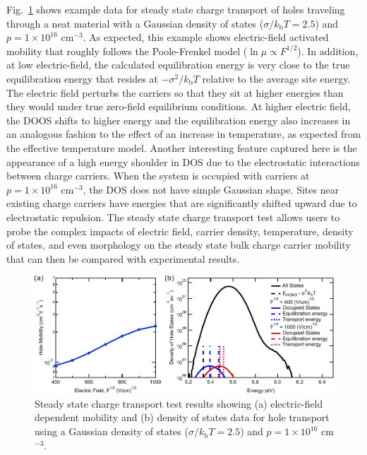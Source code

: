 \documentclass[%
 reprint,onecolumn,notitlepage,
superscriptaddress,longbibliography,
 amsmath,amssymb,
 aps,rmp,floatfix,
]{revtex4-1}
\begin{document}
Fig.\ \ref{fig:steady_transport_example} shows example data for steady state charge transport of holes traveling through a neat material with a Gaussian density of states ($\sigma / k_\text{b}T = 2.5$) and $p = 1 \times 10^{16}$ cm$^{-3}$.
As expected, this example shows electric-field activated mobility that roughly follows the Poole-Frenkel model ($\ln\mu\propto F^{1/2}$).
In addition, at low electric-field, the calculated equilibration energy is very close to the true equilibration energy that resides at $-\sigma^2 / k_\text{b}T$ relative to the average site energy. 
The electric field perturbs the carriers so that they sit at higher energies than they would under true zero-field equilibrium conditions.
At higher electric field, the DOOS shifts to higher energy and the equilibration energy also increases in an analogous fashion to the effect of an increase in temperature, as expected from the effective temperature model.\cite{baranovskii2014pssb}
Another interesting feature captured here is the appearance of a high energy shoulder in DOS due to the electrostatic interactions between charge carriers.
When the system is occupied with carriers at $p = 1 \times 10^{16}$ cm$^{-3}$, the DOS does not have simple Gaussian shape.
Sites near existing charge carriers have energies that are significantly shifted upward due to electrostatic repulsion.
The steady state charge transport test allows users to probe the complex impacts of electric field, carrier density, temperature, density of states, and even morphology on the steady state bulk charge carrier mobility that can then be compared with experimental results. 

\begin{figure}[h]
    \centering
    \includegraphics{Steady_transport_example_data.pdf}
    \caption{Steady state charge transport test results showing (a) electric-field dependent mobility and (b) density of states data for hole transport using a Gaussian density of states ($\sigma / k_\text{b}T = 2.5$) and $p = 1 \times 10^{16}$ cm$^{-3}$.}
    \label{fig:steady_transport_example}
\end{figure}
\end{document}
